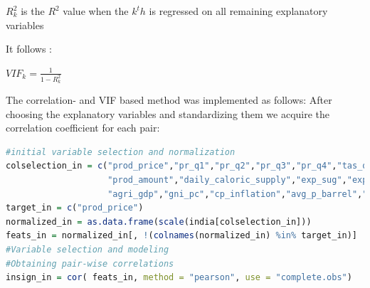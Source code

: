 \documentclass[12pt,a4paper,english]{article}
\begin{document}
$R^2_{k}$ is the $R^2$ value when the $ k^th$ is regressed on all remaining explanatory variables

It follows : \\
\begin{center} $VIF_k  =\frac{1}{1-R^2_{k}}$ \end{center}

The correlation- and VIF based method was implemented as follows:
After choosing the explanatory variables and standardizing them we acquire the correlation coefficient for each pair:

\begin{lstlisting}[language= R, captionpos=b,caption=\href{https://github.com/jaidikam/sps_ws1718/tree/master/Qfolder3}{SPL\_Q3\_india\_impvar\_vif}]
#initial variable selection and normalization
colselection_in = c("prod_price","pr_q1","pr_q2","pr_q3","pr_q4","tas_q1","tas_q2","tas_q3","tas_q4",
                    "prod_amount","daily_caloric_supply","exp_sug","exp_veg","exp_cer","imp_sug","imp_veg","imp_cer", 
                    "agri_gdp","gni_pc","cp_inflation","avg_p_barrel","population") 
target_in = c("prod_price")
normalized_in = as.data.frame(scale(india[colselection_in]))
feats_in = normalized_in[, !(colnames(normalized_in) %in% target_in)]
#Variable selection and modeling
#Obtaining pair-wise correlations 
insign_in = cor( feats_in, method = "pearson", use = "complete.obs")
\end{lstlisting}
\end{document}
